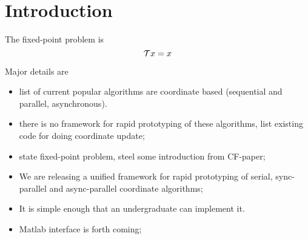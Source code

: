 \section{Introduction}
The fixed-point problem is
\begin{equation}\label{eqn:fix_point_set}
{\mathcal{T}} x = x
\end{equation}

Major details are
\begin{itemize}
\item list of current popular algorithms are coordinate based (sequential and parallel, asynchronous).
\item there is no framework for rapid prototyping of these algorithms, list existing code for doing coordinate update;
\item state fixed-point problem, steel some introduction from CF-paper;
\item We are releasing a unified framework for rapid prototyping of serial, sync-parallel and async-parallel coordinate algorithms;
\item It is simple enough that an undergraduate can implement it. 
\item Matlab interface is forth coming;
\end{itemize}

